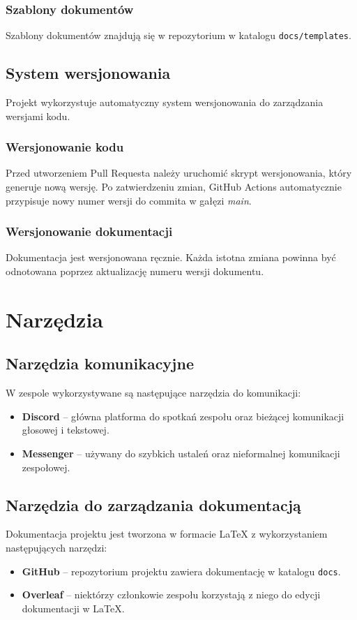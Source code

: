 \documentclass[12pt,a4paper]{book}
\begin{document}
\subsection{Szablony dokumentów}
Szablony dokumentów znajdują się w repozytorium w katalogu \texttt{docs/templates}. 

\section{System wersjonowania}
Projekt wykorzystuje automatyczny system wersjonowania do zarządzania wersjami kodu.

\subsection{Wersjonowanie kodu}
Przed utworzeniem Pull Requesta należy uruchomić skrypt wersjonowania, który generuje nową wersję. Po zatwierdzeniu zmian, GitHub Actions automatycznie przypisuje nowy numer wersji do commita w gałęzi \textit{main}.  

\subsection{Wersjonowanie dokumentacji}
Dokumentacja jest wersjonowana ręcznie. Każda istotna zmiana powinna być odnotowana poprzez aktualizację numeru wersji dokumentu.

\chapter{Narzędzia}

\section{Narzędzia komunikacyjne}  
W zespole wykorzystywane są następujące narzędzia do komunikacji:  
\begin{itemize}  
    \item \textbf{Discord} – główna platforma do spotkań zespołu oraz bieżącej komunikacji głosowej i tekstowej.  
    \item \textbf{Messenger} – używany do szybkich ustaleń oraz nieformalnej komunikacji zespołowej.  
\end{itemize}  

\section{Narzędzia do zarządzania dokumentacją}  
Dokumentacja projektu jest tworzona w formacie \LaTeX{} z wykorzystaniem następujących narzędzi:  
\begin{itemize}  
    \item \textbf{GitHub} – repozytorium projektu zawiera dokumentację w katalogu \texttt{docs}.  
    \item \textbf{Overleaf} – niektórzy członkowie zespołu korzystają z niego do edycji dokumentacji w \LaTeX{}.  
\end{itemize}  
\end{document}
